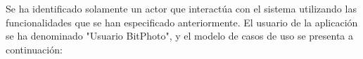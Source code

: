 \documentclass{memoria}
\begin{document}

Se ha identificado solamente un actor que interactúa con el sistema utilizando las funcionalidades que se han especificado anteriormente. El usuario de la aplicación se ha denominado "Usuario BitPhoto", y el modelo de casos de uso se presenta a continuación:\\




\end{document}
